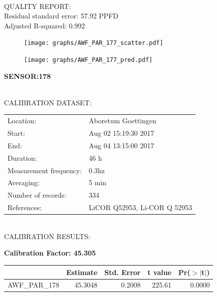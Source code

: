 \documentclass[oneside]{report}
\begin{document}
\hrulefill\\
QUALITY REPORT:\\
Residual standard error: 57.92 PPFD\\
Adjusted R-squared: 0.992



\begin{figure}[H]
  \centering
  \texttt{[image: graphs/AWF\_PAR\_177\_scatter.pdf]}
\end{figure}




\begin{figure}[H]
  \centering
  \texttt{[image: graphs/AWF\_PAR\_177\_pred.pdf]}
\end{figure}

\pagebreak


\begin{center}
\large{\textbf{SENSOR:178}}\\
\end{center}

\hrulefill\\
CALIBRATION DATASET:\\
\begin{table}[h!]
  \centering
  \label{tab:table1}
  \begin{tabular}{ll}
    Location: & Aboretum Goettingen\\ 
    
    
    Start:  & Aug 02 15:19:30 2017 \\
    End:   & Aug 04 13:15:00 2017\\ 
    Duration: & 46 h\\
    Measurement frequency: & 0.3hz\\
    Averaging:  &5 min\\
    Number of records: & 334 \\
    References: & LiCOR Q52953, Li-COR Q 52953 \\
  \end{tabular}
\end{table}

\hrulefill\\
CALIBRATION RESULTS:\\


\begin{center}
\textbf{\large{Calibration Factor: 45.305}}\\
\end{center}
\begin{table}[ht]
\centering
\begin{tabular}{rrrrr}
  \hline
 & Estimate & Std. Error & t value & Pr($>$$|$t$|$) \\ 
  \hline
AWF\_PAR\_178 & 45.3048 & 0.2008 & 225.61 & 0.0000 \\ 
   \hline
\end{tabular}
\end{table}
\end{document}
